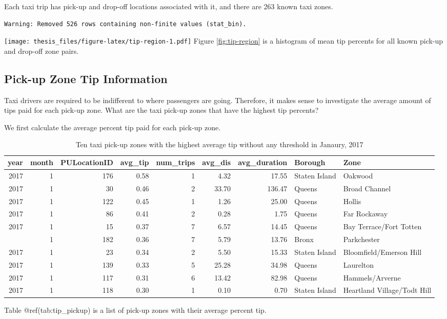\documentclass[12pt,twoside]{reedthesis}
\theoremstyle{definition}
\theoremstyle{definition}
\theoremstyle{definition}
\theoremstyle{remark}
\begin{document}
Each taxi trip has pick-up and drop-off locations associated with it,
and there are 263 known taxi zones.
\begin{verbatim}
Warning: Removed 526 rows containing non-finite values (stat_bin).
\end{verbatim}
\texttt{[image: thesis\_files/figure-latex/tip-region-1.pdf]} Figure
\ref{fig:tip-region} is a histogram of mean tip percents for all known
pick-up and drop-off zone pairs.

\subsection{Pick-up Zone Tip
Information}\label{pick-up-zone-tip-information}

Taxi drivers are required to be indifferent to where passengers are
going. Therefore, it makes sense to investigate the average amount of
tips paid for each pick-up zone. What are the taxi pick-up zones that
have the highest tip percents?

We first calculate the average percent tip paid for each pick-up zone.
\begin{table}

\caption{\label{tab:unnamed-chunk-28}Ten taxi pick-up zones with the highest average tip without any threshold in Janaury, 2017}
\centering
\begin{tabular}[t]{rrrrrrrll}
\toprule
year & month & PULocationID & avg\_tip & num\_trips & avg\_dis & avg\_duration & Borough & Zone\\
\midrule
2017 & 1 & 176 & 0.58 & 1 & 4.32 & 17.55 & Staten Island & Oakwood\\
2017 & 1 & 30 & 0.46 & 2 & 33.70 & 136.47 & Queens & Broad Channel\\
2017 & 1 & 122 & 0.45 & 1 & 1.26 & 25.00 & Queens & Hollis\\
2017 & 1 & 86 & 0.41 & 2 & 0.28 & 1.75 & Queens & Far Rockaway\\
2017 & 1 & 15 & 0.37 & 7 & 6.57 & 14.45 & Queens & Bay Terrace/Fort Totten\\
\addlinespace
2017 & 1 & 182 & 0.36 & 7 & 5.79 & 13.76 & Bronx & Parkchester\\
2017 & 1 & 23 & 0.34 & 2 & 5.50 & 15.33 & Staten Island & Bloomfield/Emerson Hill\\
2017 & 1 & 139 & 0.33 & 5 & 25.28 & 34.98 & Queens & Laurelton\\
2017 & 1 & 117 & 0.31 & 6 & 13.42 & 82.98 & Queens & Hammels/Arverne\\
2017 & 1 & 118 & 0.30 & 1 & 0.10 & 0.70 & Staten Island & Heartland Village/Todt Hill\\
\bottomrule
\end{tabular}
\end{table}
Table @ref(tab:tip\_pickup) is a list of pick-up zones with their
average percent tip.
\end{document}
